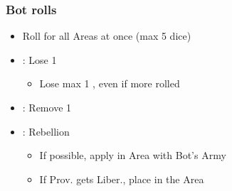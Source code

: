 \documentclass[10pt]{article}
\begin{document}
\subsubsection*{\botrules Bot rolls }
{\botrules
\begin{itemize}
	\item Roll for all Areas at once (max 5 dice)
	\item \loseducats \exhaustunits \losemonarchpower: Lose 1 \botpower
	\begin{itemize}
		\item Lose max 1 \botpower, even if more rolled
	\end{itemize}
	\item \removeunrest: Remove 1 \unrest
	\item \rebellion: Rebellion
	\begin{itemize}
		\item If possible, apply in Area with Bot's Army
		\item If Prov. gets Liber., place \claim in the Area
	\end{itemize}
\end{itemize}
}
\end{document}
